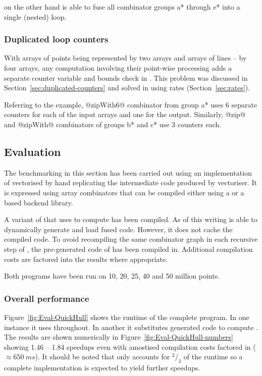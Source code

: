 \documentclass[preamble.tex]{subfiles}
\begin{document}
\LiveFusion on the other hand is able to fuse all combinator groups \*a* through \*e* into a single (nested) loop.


\subsubsection{Duplicated loop counters}

With arrays of points being represented by two arrays and arrays of lines -- by four arrays, any computation involving their point-wise processing adds a separate counter variable and bounds check in \StreamFusion. This problem was discussed in Section~\ref{sec:duplicated-counters} and solved in \LiveFusion using rates (Section~\ref{sec:rates}).

Referring to the \FilterMax example, @zipWith6@ combinator from group \*a* uses 6 separate counters for each of the input arrays and one for the output. Similarly, @zip@ and @zipWith@ combinators of groups \*b* and \*c* use 3 counters each.



\subsection{Evaluation}

The benchmarking in this section has been carried out using an implementation of \QuickHull vectorised by hand replicating the intermediate  code produced by \DPH vectoriser. It is expressed using array combinators that can be compiled either using a \StreamFusion or a \LiveFusion based backend library.

A variant of \QuickHull that uses \LiveFusion to compute \FilterMax has been compiled. As of this writing \LiveFusion is able to dynamically generate and load fused code. However, it does not cache the compiled code. To avoid recompiling the same combinator graph in each recursive step of \QuickHull, the pre-generated code of \FilterMax has been compiled in. Additional compilation costs are factored into the results where appropriate.

Both programs have been run on 10, 20, 25, 40 and 50 million points.


\subsubsection{Overall performance}

Figure~\ref{fig:Eval-QuickHull} shows the runtime of the complete \QuickHull program. In one instance it uses \StreamFusion throughout. In another it substitutes \LiveFusion generated code to compute \FilterMax. The results are shown numerically in Figure~\ref{fig:Eval-QuickHull-numbers} showing 1.46 -- 1.84 speedups even with amostised compilation costs factored in ($\approx 650\ ms$). It should be noted that \FilterMax only accounts for $^2/_3$ of the runtime so a complete \LiveFusion implementation is expected to yield further speedups.
\end{document}
